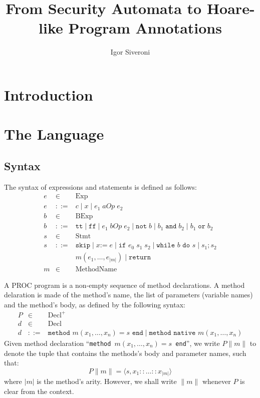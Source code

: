 \documentclass[10pt,notitlepage,twoside]{article}
\title{From Security Automata to  Hoare-like Program Annotations}
\author{Igor Siveroni}
\date{}
\begin{document}
\maketitle

\section{Introduction}

\section{The Language}

\subsection{Syntax}

The syntax of expressions and statements is defined as follows:
\begin{displaymath}
\begin{array}{rcl}
e & \in & \textrm{Exp} \\
e & ::= & c \mid x \mid e_1 \;aOp\; e_2 \\  
b & \in & \textrm{BExp} \\
b & ::= & \texttt{tt} \mid \texttt{ff} \mid e_1 \;\mathit{bOp}\; e_2 \mid
	   \texttt{not}\;b \mid b_1 \;\texttt{and}\; b_2 \mid b_1 \;\texttt{or}\; b_2   \\
s & \in & \textrm{Stmt} \\
s & ::= & \texttt{skip} \mid x \texttt{:=}\; e \mid
         \texttt{if }e_0\;s_1\;s_2 \mid
	\texttt{while }b\texttt{ do }s \mid s_1; s_2 \\
  & & m(e_1,\ldots,e_{|m|}) \mid \texttt{return} \\
m & \in & \textrm{MethodName} 
\end{array}
\end{displaymath}

A PROC program is a non-empty sequence of method declarations. A method delaration is made of the method's name, the list of parameters (variable names) and the method's body, as defined by the following syntax:
\begin{displaymath}
\begin{array}{rcl}
P & \in & \textrm{Decl}^{+}  \\
d & \in & \textrm{Decl} \\
d & ::= & \texttt{method } m(x_1,\ldots,x_n) = s \texttt{ end} \mid \texttt{method } \texttt{native } m(x_1,\ldots,x_n)
\end{array}
\end{displaymath}
Given method declaration ``\texttt{method }$m(x_1,\ldots,x_n) = s$\texttt{ end}'', we write $P\|m\|$ to denote the tuple that contains the methods's body and parameter names, such that:
\begin{displaymath}
P\|m\| = \langle s,x_1 :: \ldots ::x_{|m|} \rangle
\end{displaymath}
where $|m|$ is the method's arity. However, we shall write $\|m\|$ whenever $P$ is clear from the context.
\end{document}
